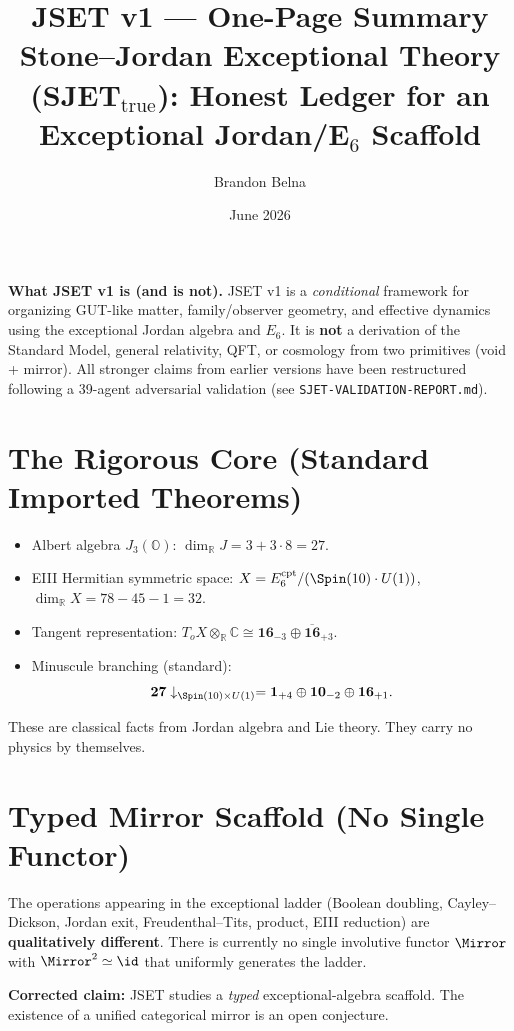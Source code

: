 \documentclass[11pt]{article}
\title{\textbf{JSET v1} — One-Page Summary\\
\large Stone–Jordan Exceptional Theory (SJET$_{\mathrm{true}}$): Honest Ledger for an Exceptional Jordan/E$_6$ Scaffold}
\author{Brandon Belna}
\date{June 2026}
\begin{document}
\maketitle

\noindent\textbf{What JSET v1 is (and is not).} JSET v1 is a \emph{conditional} framework for organizing GUT-like matter, family/observer geometry, and effective dynamics using the exceptional Jordan algebra and $E_6$. It is \textbf{not} a derivation of the Standard Model, general relativity, QFT, or cosmology from two primitives (void + mirror). All stronger claims from earlier versions have been restructured following a 39-agent adversarial validation (see \texttt{SJET-VALIDATION-REPORT.md}).

\section*{The Rigorous Core (Standard Imported Theorems)}

\begin{itemize}[leftmargin=*]
\item Albert algebra $J_3(\mathbb{O})$: $\dim_{\mathbb{R}} J = 3 + 3 \cdot 8 = 27$.
\item EIII Hermitian symmetric space: $X = E_6^{\mathrm{cpt}} / (\Spin(10) \cdot U(1))$, $\dim_{\mathbb{R}} X = 78 - 45 - 1 = 32$.
\item Tangent representation: $T_o X \otimes_{\mathbb{R}} \mathbb{C} \cong \mathbf{16}_{-3} \oplus \overline{\mathbf{16}}_{+3}$.
\item Minuscule branching (standard):
  \[
  \mathbf{27} \downarrow_{\Spin(10)\times U(1)} = \mathbf{1}_{+4} \oplus \mathbf{10}_{-2} \oplus \mathbf{16}_{+1}.
  \]
\end{itemize}

These are classical facts from Jordan algebra and Lie theory. They carry no physics by themselves.

\section*{Typed Mirror Scaffold (No Single Functor)}

The operations appearing in the exceptional ladder (Boolean doubling, Cayley–Dickson, Jordan exit, Freudenthal–Tits, product, EIII reduction) are \textbf{qualitatively different}. There is currently no single involutive functor $\Mirror$ with $\Mirror^2 \simeq \id$ that uniformly generates the ladder. 

\textbf{Corrected claim:} JSET studies a \emph{typed} exceptional-algebra scaffold. The existence of a unified categorical mirror is an open conjecture.
\end{document}
